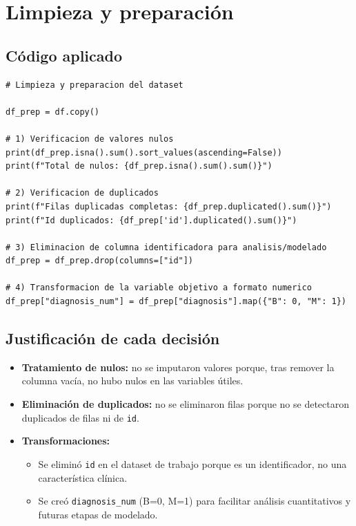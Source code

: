 \documentclass[12pt]{article}
\begin{document}
\section{Limpieza y preparación}

\subsection{Código aplicado}
\begin{lstlisting}
# Limpieza y preparacion del dataset

df_prep = df.copy()

# 1) Verificacion de valores nulos
print(df_prep.isna().sum().sort_values(ascending=False))
print(f"Total de nulos: {df_prep.isna().sum().sum()}")

# 2) Verificacion de duplicados
print(f"Filas duplicadas completas: {df_prep.duplicated().sum()}")
print(f"Id duplicados: {df_prep['id'].duplicated().sum()}")

# 3) Eliminacion de columna identificadora para analisis/modelado
df_prep = df_prep.drop(columns=["id"])

# 4) Transformacion de la variable objetivo a formato numerico
df_prep["diagnosis_num"] = df_prep["diagnosis"].map({"B": 0, "M": 1})
\end{lstlisting}

\subsection{Justificación de cada decisión}
\begin{itemize}
    \item \textbf{Tratamiento de nulos:} no se imputaron valores porque, tras remover la columna vacía, no hubo nulos en las variables útiles.
    \item \textbf{Eliminación de duplicados:} no se eliminaron filas porque no se detectaron duplicados de filas ni de \texttt{id}.
    \item \textbf{Transformaciones:}
    \begin{itemize}
        \item Se eliminó \texttt{id} en el dataset de trabajo porque es un identificador, no una característica clínica.
        \item Se creó \texttt{diagnosis\_num} (B=0, M=1) para facilitar análisis cuantitativos y futuras etapas de modelado.
    \end{itemize}
\end{itemize}
\end{document}
